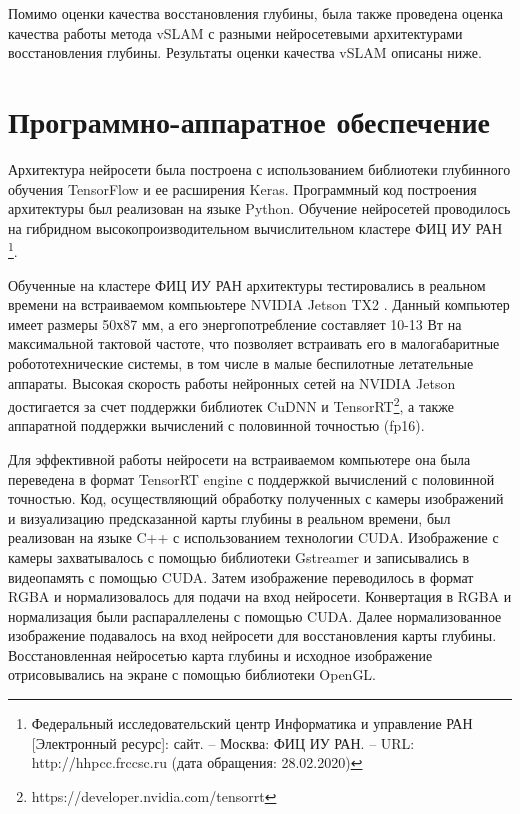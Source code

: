 \documentclass{mipt-thesis-ms}
\begin{document}
	Помимо оценки качества восстановления глубины, была также проведена оценка качества работы метода vSLAM с разными нейросетевыми архитектурами восстановления глубины. Результаты оценки качества vSLAM описаны ниже.
	
	\section{Программно-аппаратное обеспечение}
	
	Архитектура нейросети была построена с использованием библиотеки глубинного обучения TensorFlow и ее расширения Keras. Программный код построения архитектуры был реализован на языке Python. Обучение нейросетей проводилось на гибридном высокопроизводительном вычислительном кластере ФИЦ ИУ РАН \footnote{Федеральный исследовательский центр Информатика и управление РАН [Электронный ресурс]: сайт. – Москва: ФИЦ ИУ РАН. – URL: http://hhpcc.frccsc.ru (дата обращения: 28.02.2020)}.
	
	Обученные на кластере ФИЦ ИУ РАН архитектуры тестировались в реальном времени на встраиваемом компьюьтере NVIDIA Jetson TX2 \cite{franklin2017nvidia}. Данный компьютер имеет размеры 50х87 мм, а его энергопотребление составляет 10-13 Вт на максимальной тактовой частоте, что позволяет встраивать его в малогабаритные робототехнические системы, в том числе в малые беспилотные летательные аппараты. Высокая скорость работы нейронных сетей на NVIDIA Jetson достигается за счет поддержки библиотек CuDNN и TensorRT\footnote{https://developer.nvidia.com/tensorrt}, а также аппаратной поддержки вычислений с половинной точностью (fp16).
	
	Для эффективной работы нейросети на встраиваемом компьютере она была переведена в формат TensorRT engine с поддержкой вычислений с половинной точностью. Код, осуществляющий обработку полученных с камеры изображений и визуализацию предсказанной карты глубины в реальном времени, был реализован на языке C++ с использованием технологии CUDA. Изображение с камеры захватывалось с помощью библиотеки Gstreamer и записывались в видеопамять с помощью CUDA. Затем изображение переводилось в формат RGBA и нормализовалось для подачи на вход нейросети. Конвертация в RGBA и нормализация были распараллелены с помощью CUDA. Далее нормализованное изображение подавалось на вход нейросети для восстановления карты глубины. Восстановленная нейросетью карта глубины и исходное изображение отрисовывались на экране с помощью библиотеки OpenGL.
	
\end{document}
